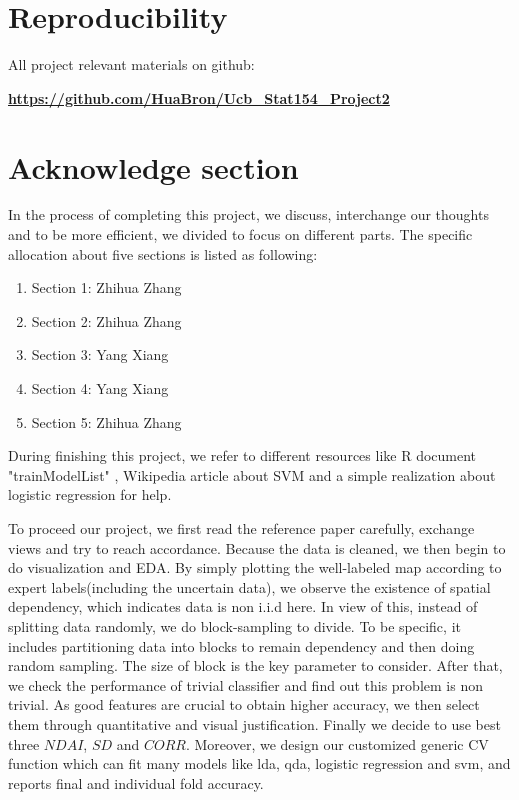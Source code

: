 \documentclass[11pt]{article}
\begin{document}
\section{Reproducibility}
\qquad \; All project relevant materials on github:\par
\quad \href{https://github.com/HuaBron/Ucb_Stat154_Project2}{\textbf{https://github.com/HuaBron/Ucb\_Stat154\_Project2}}

\newpage

\section*{Acknowledge section}
\quad In the process of completing this project, we discuss, interchange our thoughts and to be more efficient, we divided to focus on different parts. The specific allocation about five sections is listed as following:
\begin{enumerate}
	\item[] Section 1: Zhihua Zhang
	\item[] Section 2: Zhihua Zhang
	\item[] Section 3: Yang Xiang
	\item[] Section 4: Yang Xiang
	\item[] Section 5: Zhihua Zhang
\end{enumerate}
\quad During finishing this project, we refer to different resources like R document "trainModelList" \cite{RtrainModelList}, Wikipedia article about SVM \cite{SVMwiki} and a simple realization about logistic regression \cite{LogisticExample} for help.\par
\quad To proceed our project, we first read the reference paper carefully, exchange views and try to reach accordance. Because the data is cleaned, we then begin to do visualization and EDA. By simply plotting the well-labeled map according to expert labels(including the uncertain data), we observe the existence of spatial dependency, which indicates data is non i.i.d here. In view of this, instead of splitting data randomly, we do block-sampling to divide. To be specific, it includes partitioning data into blocks to remain dependency and then doing random sampling. The size of block is the key parameter to consider. After that, we check the performance of trivial classifier and find out this problem is non trivial. As good features are crucial to obtain higher accuracy, we then select them through quantitative and visual justification. Finally we decide to use best three $NDAI$, $SD$ and $CORR$. Moreover, we design our customized generic CV function which can fit many models like lda, qda, logistic regression and svm, and reports final and individual fold accuracy.\par
\end{document}
